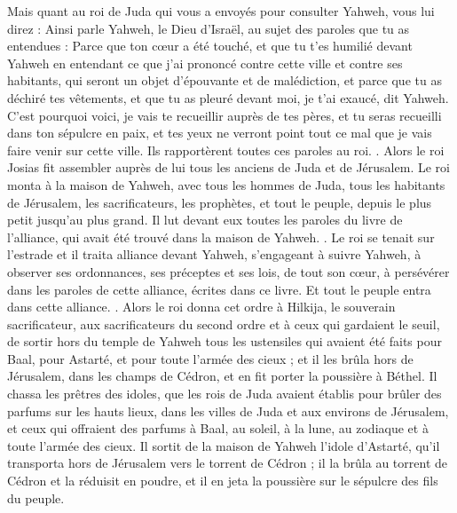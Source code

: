 \begin{multicols}{2}
Mais quant au roi de Juda qui vous a envoyés pour consulter Yahweh, vous lui direz : Ainsi parle Yahweh, le Dieu d'Israël, au sujet des paroles que tu as entendues :
Parce que ton cœur a été touché, et que tu t'es humilié devant Yahweh en entendant ce que j'ai prononcé contre cette ville et contre ses habitants, qui seront un objet d'épouvante et de malédiction, et parce que tu as déchiré tes vêtements, et que tu as pleuré devant moi, je t'ai exaucé, dit Yahweh.
C'est pourquoi voici, je vais te recueillir auprès de tes pères, et tu seras recueilli dans ton sépulcre en paix, et tes yeux ne verront point tout ce mal que je vais faire venir sur cette ville. Ils rapportèrent toutes ces paroles au roi.
.
\VerseOne{}Alors le roi Josias fit assembler auprès de lui tous les anciens de Juda et de Jérusalem.
Le roi monta à la maison de Yahweh, avec tous les hommes de Juda, tous les habitants de Jérusalem, les sacrificateurs, les prophètes, et tout le peuple, depuis le plus petit jusqu'au plus grand. Il lut devant eux toutes les paroles du livre de l'alliance, qui avait été trouvé dans la maison de Yahweh.
.
Le roi se tenait sur l'estrade et il traita alliance devant Yahweh, s'engageant à suivre Yahweh, à observer ses ordonnances, ses préceptes et ses lois, de tout son cœur, à persévérer dans les paroles de cette alliance, écrites dans ce livre. Et tout le peuple entra dans cette alliance.
.
Alors le roi donna cet ordre à Hilkija, le souverain sacrificateur, aux sacrificateurs du second ordre et à ceux qui gardaient le seuil, de sortir hors du temple de Yahweh tous les ustensiles qui avaient été faits pour Baal, pour Astarté, et pour toute l'armée des cieux ; et il les brûla hors de Jérusalem, dans les champs de Cédron, et en fit porter la poussière à Béthel.
Il chassa les prêtres des idoles, que les rois de Juda avaient établis pour brûler des parfums sur les hauts lieux, dans les villes de Juda et aux environs de Jérusalem, et ceux qui offraient des parfums à Baal, au soleil, à la lune, au zodiaque et à toute l'armée des cieux.
Il sortit de la maison de Yahweh l'idole d'Astarté, qu'il transporta hors de Jérusalem vers le torrent de Cédron ; il la brûla au torrent de Cédron et la réduisit en poudre, et il en jeta la poussière sur le sépulcre des fils du peuple.

\end{multicols}
